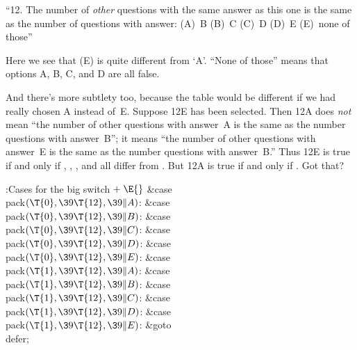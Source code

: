``12. The number of {\it other\/} questions with the same
answer as this one
is the same as the number of questions with answer:
(A)~B (B)~C (C)~D (D)~E (E)~none of those''

Here we see that (E) is quite different from `A'. ``None of those'' means
that options A, B, C, and D are all false.

And there's more subtlety too, because the  table would be
different if
we had really chosen A instead of~E\null. Suppose 12E has been selected.
Then 12A does {\it not\/} mean ``the number of other questions
with answer~A is the same as the number questions with answer~B''; it means
``the number of other questions
with answer~E is the same as the number questions with answer~B.''
Thus 12E is true if and only if , , ,
and  all differ from . But 12A is
true if and only if
. Got that?

\Y\B\4:Cases for the big switch\X${}\mathrel+\E{}$\6
\4\&{case} \\{pack}${}(\T{0},\39\T{12},\39\|A){}$:\5
\&{case} \\{pack}${}(\T{0},\39\T{12},\39\|B){}$:\5
\&{case} \\{pack}${}(\T{0},\39\T{12},\39\|C){}$:\5
\&{case} \\{pack}${}(\T{0},\39\T{12},\39\|D){}$:\5
\&{case} \\{pack}${}(\T{0},\39\T{12},\39\|E){}$:\5
\&{case} \\{pack}${}(\T{1},\39\T{12},\39\|A){}$:\5
\&{case} \\{pack}${}(\T{1},\39\T{12},\39\|B){}$:\5
\&{case} \\{pack}${}(\T{1},\39\T{12},\39\|C){}$:\5
\&{case} \\{pack}${}(\T{1},\39\T{12},\39\|D){}$:\5
\&{case} \\{pack}${}(\T{1},\39\T{12},\39\|E){}$:\5
\&{goto} \\{defer};\par
\fi


